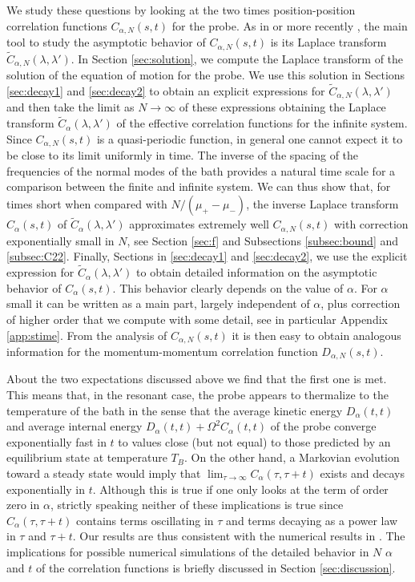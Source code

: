 \documentclass[11pt]{article}
\numberwithin{equation}{section}
\def\red{\textcolor{red}}
\def\red{}
\numberwithin{theorem}{section}
\begin{document}
We study these questions by looking at the two times position-position correlation functions $C_{\alpha,N}(s,t)$ for the
probe. \red{As in \cite{Rubin1,Rubin2} or more recently \cite{Plyu}, the main tool to study the asymptotic behavior of $C_{\alpha,N}(s,t)$ 
is its
Laplace transform $\widetilde C_{\alpha,N}(\lambda,\lambda')$.} In Section \ref{sec:solution}, we compute the Laplace
transform of the solution of the equation of motion for the probe. We use this solution in Sections \ref{sec:decay1} and
\ref{sec:decay2} to obtain an explicit expressions for $\widetilde C_{\alpha,N}(\lambda,\lambda')$ and  then take the
limit as $N\to\infty$ of these expressions obtaining the Laplace transform $\widetilde C_{\alpha}(\lambda,\lambda')$ of
the effective correlation functions for the infinite system. Since $C_{\alpha,N}(s,t)$ is a quasi-periodic function, in
general one cannot expect it to be close to its limit uniformly in time. The inverse of the spacing of the frequencies
of the normal modes of the bath provides a natural time scale for a comparison between the finite and infinite system.
We can thus show that, for times short when compared with $N/(\mu_+-\mu_-)$, the inverse Laplace transform
$C_{\alpha}(s,t)$ of $\widetilde C_{\alpha}(\lambda,\lambda')$ approximates extremely well $C_{\alpha,N}(s,t)$ with
correction exponentially small in $N$, see Section \ref{sec:f} and Subsections \ref{subsec:bound} and \ref{subsec:C22}.
Finally, Sections in \ref{sec:decay1} and \ref{sec:decay2}, we use the explicit expression for $\widetilde
C_{\alpha}(\lambda,\lambda')$ to obtain detailed information on the  asymptotic behavior of $C_{\alpha}(s,t)$. \red{This
behavior clearly depends on the value of $\alpha$. For $\alpha$ small it can be written as a main part, largely
independent of $\alpha$, plus correction of higher order that we compute with some detail, see in particular Appendix
\ref{app:stime}.} From the analysis of $C_{\alpha,N}(s,t)$ it is then easy to obtain analogous information for the
momentum-momentum correlation function $D_{\alpha,N}(s,t)$.

About the two expectations discussed above we find that the first one is met. This means that, in the resonant case, the
probe appears to thermalize to the temperature of the bath in the sense that the average kinetic energy
$D_{\alpha}(t,t)$ and average internal energy $D_{\alpha}(t,t)+\Omega^2 C_{\alpha}(t,t)$ of the probe converge
exponentially fast in $t$ to values close (but not equal) to those predicted by an equilibrium state at temperature
$T_B$. On the other hand, a Markovian evolution toward a steady state would imply that $\lim_{\tau\to\infty}
C_\alpha(\tau,\tau+t)$ exists and decays exponentially in $t$.  Although this is true if one only looks at the term of
order zero in $\alpha$, strictly speaking neither of these implications is true since $C_\alpha(\tau,\tau+t)$ contains
terms oscillating in $\tau$ and terms decaying as a power law in $\tau$ and $\tau+t$. \red{Our results are thus
consistent with the numerical results in \cite{Onofrio}. The implications for possible numerical simulations of the
detailed behavior in $N$ $\alpha$ and $t$ of the correlation functions is briefly discussed in Section
\ref{sec:discussion}.}
\end{document}
